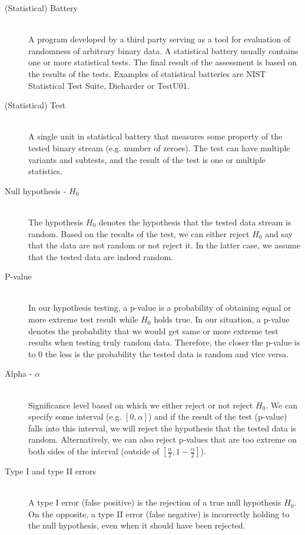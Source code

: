 \documentclass[
  digital,  	%
  color,		%
  oneside,   	%
  12pt,
  nocover,
  notable,
  nolof,
  nolot,
]{fithesis3}
\theoremstyle{definition}
\theoremstyle{remark}
\begin{document}
\begin{description}
\item[(Statistical) Battery] \hfill \\
A program developed by a third party serving as a tool for evaluation of randomness of arbitrary binary data. A statistical battery usually contains one or more statistical tests. The final result of the assessment is based on the results of the tests. Examples of statistical batteries are NIST Statistical Test Suite, Dieharder or TestU01.

\item[(Statistical) Test] \hfill \\
A single unit in statistical battery that measures some property of the tested binary stream (e.g. number of zeroes). The test can have multiple variants and subtests, and the result of the test is one or multiple statistics.

\item[Null hypothesis - $H_0$] \hfill \\
The hypothesis $H_0$ denotes the hypothesis that the tested data stream is random. Based on the results of the test, we can either reject $H_0$ and say that the data are not random or not reject it. In the latter case, we assume that the tested data are indeed random.

\item[P-value] \hfill \\
In our hypothesis testing, a p-value is a probability of obtaining equal or more extreme test result while $H_0$ holds true. In our situation, a p-value denotes the probability that we would get same or more extreme test results when testing truly random data. Therefore, the closer the p-value is to 0 the less is the probability the tested data is random and vice versa.

\item[Alpha - $\alpha$] \hfill \\
Significance level based on which we either reject or not reject $H_0$. We can specify some interval (e.g. $[0,\alpha]$) and if the result of the test (p-value) falls into this interval, we will reject the hypothesis that the tested data is random. Alternatively, we can also reject p-values that are too extreme on both sides of the interval (outside of $\left[\frac{\alpha}{2},1-\frac{\alpha}{2}\right]$).

\item[Type I and type II errors] \hfill \\
A type I error (false positive) is the rejection of a true null hypothesis $H_0$. On the opposite, a type II error (false negative) is incorrectly holding to the null hypothesis, even when it should have been rejected.


\end{description}
\end{document}
